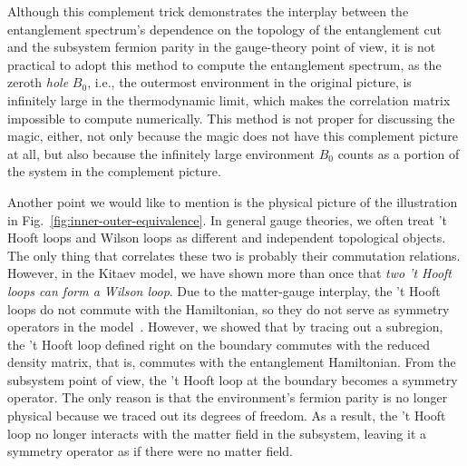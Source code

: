 \documentclass[12font]{article}
\theoremstyle{definition}
\begin{document}
Although this complement trick demonstrates the interplay between the entanglement spectrum's dependence on the topology of the entanglement cut and the subsystem fermion parity in the gauge-theory point of view, it is not practical to adopt this method to compute the entanglement spectrum, as the zeroth \textit{hole} $B_0$, i.e., the outermost environment in the original picture, is infinitely large in the thermodynamic limit, which makes the correlation matrix impossible to compute numerically. This method is not proper for discussing the magic, either, not only because the magic does not have this complement picture at all, but also because the infinitely large environment $B_0$ counts as a portion of the system in the complement picture.

Another point we would like to mention is the physical picture of the illustration in Fig.~\eqref{fig:inner-outer-equivalence}. In general gauge theories, we often treat 't Hooft loops and Wilson loops as different and independent topological objects. The only thing that correlates these two is probably their commutation relations. However, in the Kitaev model, we have shown more than once that \textit{two 't Hooft loops can form a Wilson loop}. Due to the matter-gauge interplay, the 't Hooft loops do not commute with the Hamiltonian, so they do not serve as symmetry operators in the model~\cite{Xu-Knap-Pollmann_2025}. However, we showed that by tracing out a subregion, the 't Hooft loop defined right on the boundary commutes with the reduced density matrix, that is, commutes with the entanglement Hamiltonian. From the subsystem point of view, the 't Hooft loop at the boundary becomes a symmetry operator. The only reason is that the environment's fermion parity is no longer physical because we traced out its degrees of freedom. As a result, the 't Hooft loop no longer interacts with the matter field in the subsystem, leaving it a symmetry operator as if there were no matter field. 
\end{document}
